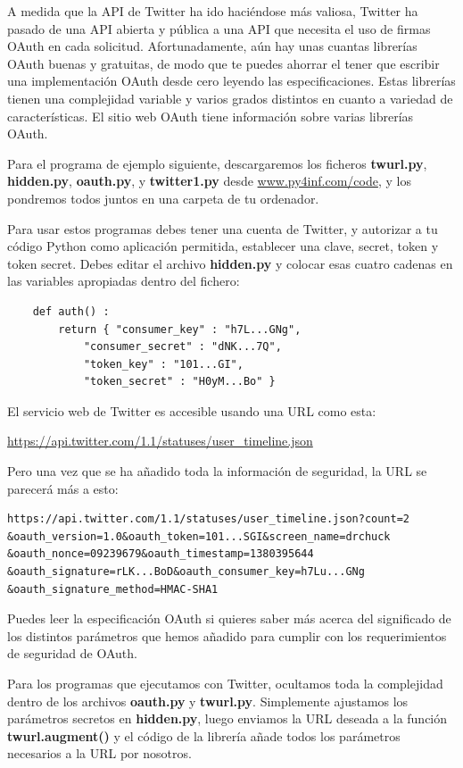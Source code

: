 A medida que la API de Twitter ha ido haciéndose más valiosa, Twitter
ha pasado de una API abierta y pública a una API que necesita
el uso de firmas OAuth en cada solicitud. Afortunadamente,
aún hay unas cuantas librerías OAuth buenas y gratuitas,
de modo que te puedes ahorrar el tener que escribir una implementación OAuth
desde cero leyendo las especificaciones. Estas librerías tienen
una complejidad variable y varios grados distintos en cuanto a variedad de características.
El sitio web OAuth tiene información sobre varias librerías OAuth.

Para el programa de ejemplo siguiente, descargaremos los ficheros
{\bf twurl.py}, {\bf hidden.py}, 
{\bf oauth.py}, 
y
{\bf twitter1.py} desde
\url{www.py4inf.com/code}, y los pondremos todos juntos en una carpeta
de tu ordenador.

Para usar estos programas debes tener una cuenta de Twitter,
y autorizar a tu código Python como aplicación permitida,
establecer una clave, secret, token y token secret. Debes editar
el archivo {\bf hidden.py} y colocar esas cuatro cadenas en las
variables apropiadas dentro del fichero:

\beforeverb
\begin{verbatim}
    def auth() :
        return { "consumer_key" : "h7L...GNg",
            "consumer_secret" : "dNK...7Q",
            "token_key" : "101...GI",
            "token_secret" : "H0yM...Bo" }
\end{verbatim}
\afterverb
%
El servicio web de Twitter es accesible usando una URL como esta:

\url{https://api.twitter.com/1.1/statuses/user_timeline.json}

Pero una vez que se ha añadido toda la información de seguridad, la URL
se parecerá más a esto:

\beforeverb
\begin{verbatim}
https://api.twitter.com/1.1/statuses/user_timeline.json?count=2
&oauth_version=1.0&oauth_token=101...SGI&screen_name=drchuck
&oauth_nonce=09239679&oauth_timestamp=1380395644
&oauth_signature=rLK...BoD&oauth_consumer_key=h7Lu...GNg
&oauth_signature_method=HMAC-SHA1
\end{verbatim}
\afterverb
%
Puedes leer la especificación OAuth si quieres saber más
acerca del significado de los distintos parámetros que
hemos añadido para cumplir con los requerimientos de seguridad de OAuth.

Para los programas que ejecutamos con Twitter, ocultamos toda la
complejidad dentro de los archivos {\bf oauth.py} y {\bf twurl.py}.
Simplemente ajustamos los parámetros secretos en {\bf hidden.py}, luego
enviamos la URL deseada a la función {\bf twurl.augment()}
y el código de la librería añade todos los parámetros
necesarios a la URL por nosotros.

